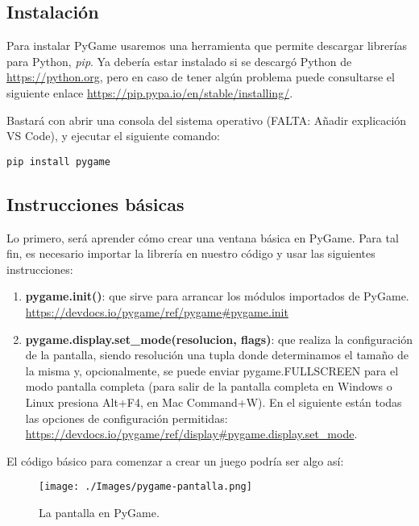 \subsection{Instalación}

Para instalar PyGame usaremos una herramienta que permite descargar librerías para Python, \emph{pip}. Ya debería estar instalado si se descargó Python de \url{https://python.org}, pero en caso de tener algún problema puede consultarse el siguiente enlace \url{https://pip.pypa.io/en/stable/installing/}.

Bastará con abrir una consola del sistema operativo (FALTA: Añadir explicación VS Code), y ejecutar el siguiente comando:

\begin{lstlisting}
pip install pygame
\end{lstlisting}

\subsection{Instrucciones básicas}

Lo primero, será aprender cómo crear una ventana básica en PyGame. Para tal fin, es necesario importar la librería en nuestro código y usar las siguientes instrucciones:

\begin{enumerate}
\item \textbf{pygame.init()}: que sirve para arrancar los módulos importados de PyGame. \url{https://devdocs.io/pygame/ref/pygame#pygame.init}

\item \textbf{pygame.display.set\_mode(resolucion, flags)}: que realiza la configuración de la pantalla, siendo resolución una tupla donde determinamos el tamaño de la misma y, opcionalmente, se puede enviar pygame.FULLSCREEN para el modo pantalla completa (para salir de la pantalla completa en Windows o Linux presiona Alt+F4, en Mac Command+W). En el siguiente están todas las opciones de configuración permitidas: \url{https://devdocs.io/pygame/ref/display#pygame.display.set_mode}.
\end{enumerate}

El código básico para comenzar a crear un juego podría ser algo así:



\begin{figure}[h!]
	\centering
	\texttt{[image: ./Images/pygame-pantalla.png]}
	\caption{La pantalla en PyGame.}
	\label{pygame-pantalla}
\end{figure}

